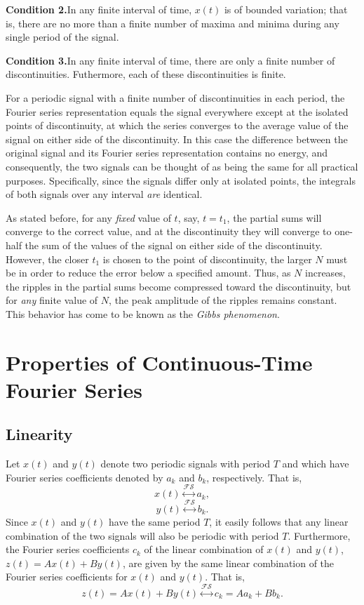 \documentclass[a4paper,twoside]{book}
\begin{document}
\noindent\textbf{Condition 2.}\quad In any finite interval of time, $x(t)$ is of bounded variation; that is, there are no more than a finite number of maxima and minima during any single period of the signal.

\noindent\textbf{Condition 3.}\quad In any finite interval of time, there are only a finite number of discontinuities. Futhermore, each of these discontinuities is finite.

For a periodic signal with a finite number of discontinuities in each period, the Fourier series representation equals the signal everywhere except at the isolated points of discontinuity, at which the series converges to the average value of the signal on either side of the discontinuity. In this case the difference between the original signal and its Fourier series representation contains no energy, and consequently, the two signals can be thought of as being the same for all practical purposes. Specifically, since the signals differ only at isolated points, the integrals of both signals over any interval \textit{are} identical.

As stated before, for any \textit{fixed} value of $t$, say, $t=t_1$, the partial sums will converge to the correct value, and at the discontinuity they will converge to one-half the sum of the values of the signal on either side of the discontinuity. However, the closer $t_1$ is chosen to the point of discontinuity, the larger $N$ must be in order to reduce the error below a specified amount. Thus, as $N$ increases, the ripples in the partial sums become compressed toward the discontinuity, but for \textit{any} finite value of $N$, the peak amplitude of the ripples remains constant. This behavior has come to be known as the \textit{Gibbs phenomenon}.

\section{Properties of Continuous-Time Fourier Series}
\subsection{Linearity}

Let $x(t)$ and $y(t)$ denote two periodic signals with period $T$ and which have Fourier series coefficients denoted by $a_k$ and $b_k$, respectively. That is, $$x(t)\overset{\mathcal{FS}}{\longleftrightarrow}a_k,$$$$y(t)\overset{\mathcal{FS}}{\longleftrightarrow}b_k.$$ Since $x(t)$ and $y(t)$ have the same period $T$, it easily follows that any linear combination of the two signals will also be periodic with period $T$. Furthermore, the Fourier series coefficients $c_k$ of the linear combination of $x(t)$ and $y(t)$, $z(t)=Ax(t)+By(t)$, are given by the same linear combination of the Fourier series coefficients for $x(t)$ and $y(t)$. That is,
\begin{equation}
    z(t) = Ax(t)+By(t) \overset{\mathcal{FS}}{\longleftrightarrow} c_{k} = Aa_{k} + Bb_{k}.
    \label{3.58}
\end{equation}
\end{document}
